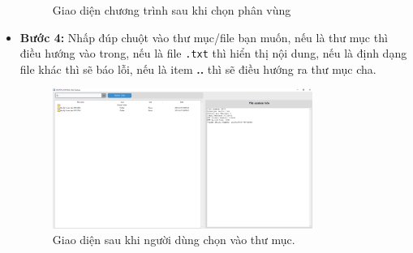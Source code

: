 \begin{itemize}
\begin{figure}[H]
    \centering
    \qquad
    \caption{Giao diện chương trình sau khi chọn phân vùng}%
    \label{fig:stackArrayPush}%
\end{figure}

    \newpage
    \item \textbf{Bước 4:} Nhấp đúp chuột vào thư mục/file bạn muốn, nếu là thư mục thì điều hướng vào trong, nếu là file \texttt{.txt} thì hiển thị nội dung, nếu là định dạng file khác thì sẽ báo lỗi, nếu là item \textbf{..} thì sẽ điều hướng ra thư mục cha. 

      \begin{figure}[H]
        \centering
        \includegraphics[width=0.8\textwidth]{images/img3.png} 
        \caption{Giao diện sau khi người dùng chọn vào thư mục.}
        \label{figure:s1}
\end{figure}


\end{itemize}
